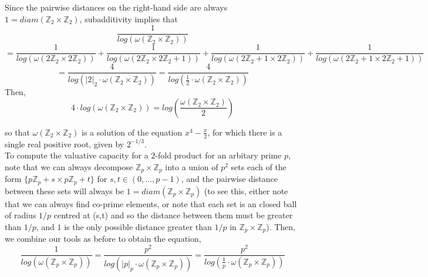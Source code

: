 Since the pairwise distances on the right-hand side are always $1 = diam(\mathbb{Z}_2 \times \mathbb{Z}_2)$, subadditivity implies that \\

\[
\frac{1}{log(\omega(\mathbb{Z}_2 \times \mathbb{Z}_2))} \]
\[ = \frac{1}{log(\omega(2\mathbb{Z}_2 \times 2\mathbb{Z}_2))} + \frac{1}{log(\omega(2\mathbb{Z}_2 \times 2\mathbb{Z}_2 +1))} + \frac{1}{log(\omega(2\mathbb{Z}_2+1 \times 2\mathbb{Z}_2))} + \frac{1}{log(\omega(2\mathbb{Z}_2+1 \times 2\mathbb{Z}_2+1))}\]
\[ = \frac{4}{log(\lvert 2 \rvert_2 \cdot \omega(\mathbb{Z}_2 \times \mathbb{Z}_2))} = \frac{4}{log(\frac{1}{2} \cdot \omega(\mathbb{Z}_2 \times \mathbb{Z}_2))}\]%
Then,
\[4\cdot log(\omega(\mathbb{Z}_2 \times \mathbb{Z}_2)) =log(\frac{\omega(\mathbb{Z}_2 \times \mathbb{Z}_2)}{2}) \]



so that ${\omega(\mathbb{Z}_2 \times \mathbb{Z}_2)}$ is a solution of the equation $x^4 - \frac{x}{2}$, for which there is a single real positive root, given by $2^{-1/3}$.\\


To compute the valuative capacity for a $2$-fold product for an arbitary prime $p$, note that we can always decompose $\mathbb{Z}_p \times \mathbb{Z}_p$ into a union of $p^2$ sets each of the form $\{p\mathbb{Z}_p+s \times p\mathbb{Z}_p +t\}$ for $s,t \in (0,\ldots, p-1)$, and the pairwise distance between these sets will always be $1 = diam(\mathbb{Z}_p \times \mathbb{Z}_p)$ (to see this, either note that we can always find co-prime elements, or note that each set is an closed ball of radius $1/p$ centred at (s,t) and so the distance between them must be greater than $1/p$, and $1$ is the only possible distance greater than $1/p$ in $\mathbb{Z}_p \times \mathbb{Z}_p$).  Then, we combine our tools as before to obtain the equation,\\

\[\frac{1}{log(\omega(\mathbb{Z}_p \times \mathbb{Z}_p))} = \frac{p^2}{log(\lvert p \rvert_p \cdot \omega(\mathbb{Z}_p \times \mathbb{Z}_p))} =  \frac{p^2}{log(\frac{1}{p} \cdot \omega(\mathbb{Z}_p \times \mathbb{Z}_p))}    \]

